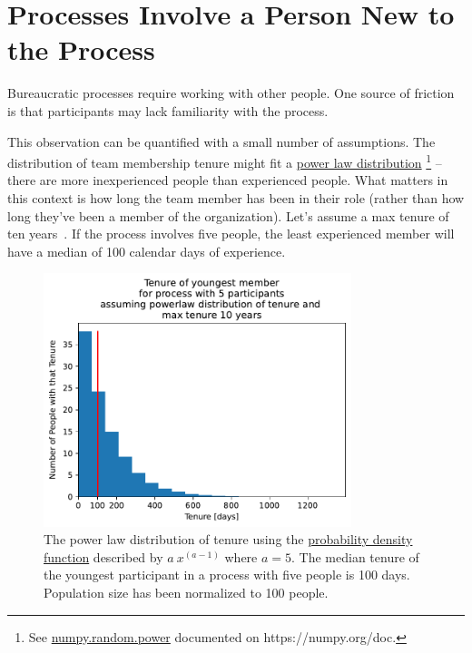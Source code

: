 \section{Processes Involve a Person New to the Process}



Bureaucratic processes require working with other people. One source of friction is that participants may lack familiarity with the process. 

This observation can be quantified with a small number of assumptions. The distribution of team membership tenure might fit a \href{https://en.wikipedia.org/wiki/Power_law}{power law distribution}
\footnote{See \href{https://numpy.org/doc/stable/reference/random/generated/numpy.random.power.html}{numpy.random.power} documented on https://numpy.org/doc.}
-- there are more inexperienced people than experienced people. What matters in this context is how long the team member has been in their role (rather than how long they've been a member of the organization). Let's assume a max tenure of ten years~\cite{2022_BLS_tenure}. If the process involves five people, the least experienced member will have a median of 100 calendar days of experience.

\begin{figure}[!htb] %
    \centering
    \includegraphics[width=0.8\textwidth]{images/tenure_power_distribution_a5_with_max_tenure10_and_5_participants.pdf}
    \caption{The power law distribution of tenure using the \href{https://en.wikipedia.org/wiki/Probability_density_function}{probability density function}
    described by $a\ x^{(a-1)}$ where $a=5$. The median tenure of the youngest participant  in a process with five people is 100 days. Population size has been normalized to 100 people.}
    \label{fig:tenure-powerlaw-5-participants-tenure10}
\end{figure}


